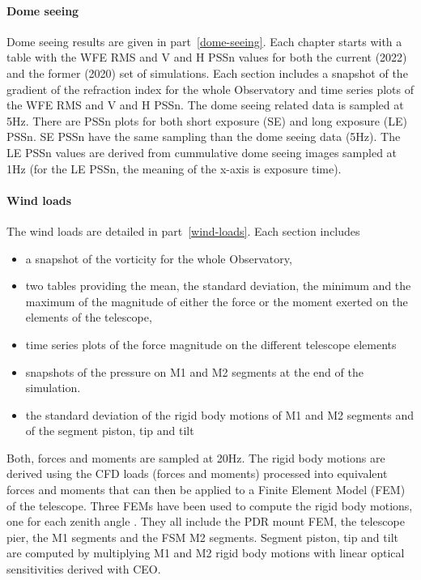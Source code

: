 \paragraph{Dome seeing}

Dome seeing results are given in part~\ref{dome-seeing}.
Each chapter starts with a table with the WFE RMS and V and H PSSn values for both the current (2022) and the former (2020) set of simulations.
Each section includes a snapshot of the gradient of the refraction index for the whole Observatory and time series plots of the WFE RMS and V and H PSSn.
The dome seeing related data is sampled at 5Hz.
There are PSSn plots for both short exposure (SE) and long exposure (LE) PSSn.
SE PSSn have the same sampling than the dome seeing data (5Hz).
The LE PSSn values are derived from cummulative dome seeing images sampled at 1Hz (for the LE PSSn, the meaning of the x-axis is exposure time).

\paragraph{Wind loads}

The wind loads are detailed in part~\ref{wind-loads}.
Each section includes
\begin{itemize}
  \item a snapshot of the vorticity for the whole Observatory,
\item two tables providing the mean, the standard deviation, the minimum and the
maximum of the magnitude of either the force or the moment exerted on the
elements of the telescope, 
\item time series plots of the force magnitude on the
different telescope elements 
\item snapshots of the pressure on M1 and M2 segments at the end of the simulation.
\item the standard deviation of the rigid body motions of M1 and M2 segments and of the segment piston, tip and tilt
\end{itemize}
Both, forces and moments are sampled at 20Hz.
The rigid body motions are derived using the CFD loads (forces and moments) processed into equivalent forces and moments 
that can then be applied to a Finite Element Model (FEM) of the telescope\cite{GMT.DOC.05506}.
Three FEMs have been used to compute the rigid body motions, one for each zenith angle \cite{20220611_1945_MT_mount_zen_00_m1HFN_FSM_,20220610_1023_MT_mount_zen_30_m1HFN_FSM_,20220621_1443_MT_mount_zen_60_m1HFN_FSM_}.
They all include the PDR mount FEM, the telescope pier,
 the M1 segments and the FSM M2 segments.
Segment piston, tip and tilt are computed by multiplying M1 and M2 rigid body motions
 with linear optical sensitivities derived with CEO\cite{CEO}.

